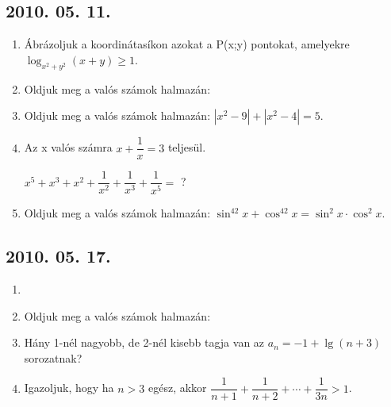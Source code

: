 \subsection*{2010. 05. 11.}
\begin{enumerate}

\item Ábrázoljuk a koordinátasíkon azokat a P(x;y) pontokat, amelyekre
$\log_{x^2+y^2}(x+y) \geq 1$.

\item Oldjuk meg a valós számok halmazán:

\item Oldjuk meg a valós számok halmazán: 
$|x^2-9|+|x^2-4| = 5$.

\item Az x valós számra $x+\dfrac{1}{x} = 3$ teljesül.

\centerline{$x^5+x^3+x^2+\dfrac{1}{x^2}+\dfrac{1}{x^3}+\dfrac{1}{x^5} = $ ?}

\item Oldjuk meg a valós számok halmazán:
$\sin^42x+\cos^42x = \sin^2x \cdot \cos^2x$.

\end{enumerate}

\subsection*{2010. 05. 17.}
\begin{enumerate}

\item
{}

\item Oldjuk meg a valós számok halmazán: 

\item Hány 1-nél nagyobb, de 2-nél kisebb tagja van az $a_n = -1 + \lg(n+3)$ sorozatnak?

\item Igazoljuk, hogy ha $n > 3$ egész, akkor $\dfrac{1}{n+1} + \dfrac{1}{n+2} + \cdots + \dfrac{1}{3n} > 1$.

\end{enumerate}

